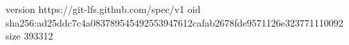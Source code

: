 version https://git-lfs.github.com/spec/v1
oid sha256:ad25ddc7c4a083789545492553947612cafab2678fde9571126e323771110092
size 393312
